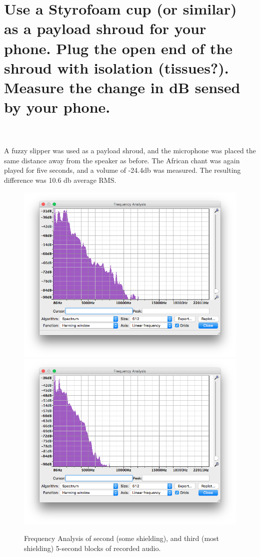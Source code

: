 \documentclass[onecolumn,10pt]{jhwhw}
\begin{document}
\part{Use a Styrofoam cup (or similar) as a payload shroud for your phone. Plug the open end of the shroud with isolation (tissues?). Measure the change in dB sensed by your phone.}
\\
\\
\noindent A fuzzy slipper was used as a payload shroud, and the microphone was placed the same distance away from the speaker as before. The African chant was again played for five seconds, and a volume of -24.4db was measured. The resulting difference was 10.6 db average RMS.
\begin{figure}[tbh!]
\begin{center}
\includegraphics[height=.3\textheight]{level2.png}
\includegraphics[height=.3\textheight]{level3.png}
\end{center}
\caption{Frequency Analysis of second (some shielding), and third (most shielding) 5-second blocks of recorded audio.}
\end{figure}
\end{document}
